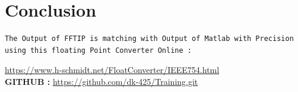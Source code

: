 \documentclass{article}
\begin{document}
\section{Conclusion}
\begin{lstlisting}
The Output of FFTIP is matching with Output of Matlab with Precision 
using this floating Point Converter Online :

\end{lstlisting}
\url{https://www.h-schmidt.net/FloatConverter/IEEE754.html}
\vspace{4cm}
\\
\textbf{GITHUB :} \url{https://github.com/dk-425/Training.git}
\end{document}
